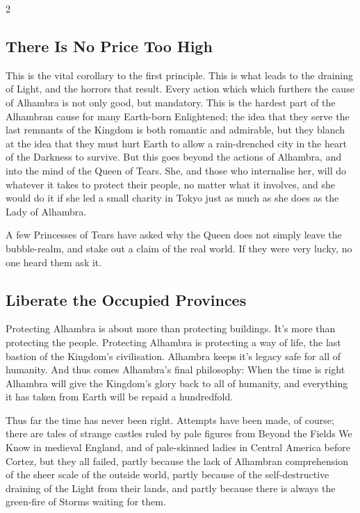 \begin{multicols}{2}
\subsection*{There Is No Price Too High}

This is the vital corollary to the first principle. This is what leads to the draining of Light, and the horrors that result. Every action which which furthers the cause of Alhambra is not only good, but mandatory. This is the hardest part of the Alhambran cause for many Earth-born Enlightened; the idea that they serve the last remnants of the Kingdom is both romantic and admirable, but they blanch at the idea that they must hurt Earth to allow a rain-drenched city in the heart of the Darkness to survive. But this goes beyond the actions of Alhambra, and into the mind of the Queen of Tears. She, and those who internalise her, will do whatever it takes to protect their people, no matter what it involves, and she would do it if she led a small charity in Tokyo just as much as she does as the Lady of Alhambra. 

A few Princesses of Tears have asked why the Queen does not simply leave the bubble-realm, and stake out a claim of the real world. If they were very lucky, no one heard them ask it. 

\subsection*{Liberate the Occupied Provinces}

Protecting Alhambra is about more than protecting buildings. It's more than protecting the people. Protecting Alhambra is protecting a way of life, the last bastion of the Kingdom's civilisation. Alhambra keeps it's legacy safe for all of humanity. And thus comes Alhambra's final philosophy: When the time is right Alhambra will give the Kingdom's glory back to all of humanity, and everything it has taken from Earth will be repaid a hundredfold. 

Thus far the time has never been right. Attempts have been made, of course; there are tales of strange castles ruled by pale figures from Beyond the Fields We Know in medieval England, and of pale-skinned ladies in Central America before Cortez, but they all failed, partly because the lack of Alhambran comprehension of the sheer scale of the outside world, partly because of the self-destructive draining of the Light from their lands, and partly because there is always the green-fire of Storms waiting for them. 


\end{multicols}
